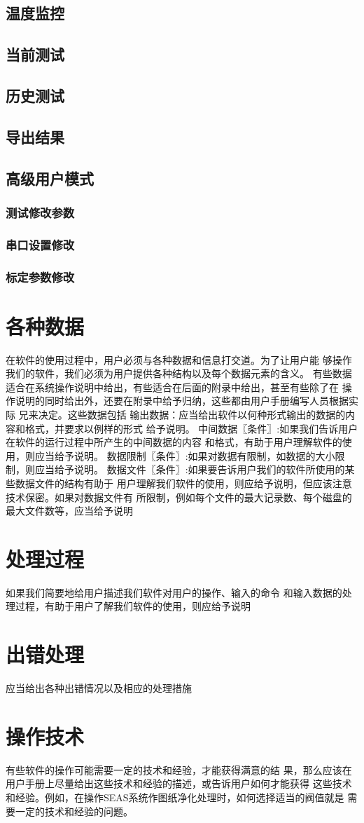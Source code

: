 \subsection{温度监控}
\subsection{当前测试}
\subsection{历史测试}
\subsection{导出结果}
\subsection{高级用户模式\label{subsec:advancedUser}}
\subsubsection*{测试修改参数}
\subsubsection*{串口设置修改}
\subsubsection*{标定参数修改}
\section{各种数据}在软件的使用过程中，用户必须与各种数据和信息打交道。为了让用户能
够操作我们的软件，我们必须为用户提供各种结构以及每个数据元素的含义。
有些数据适合在系统操作说明中给出，有些适合在后面的附录中给出，甚至有些除了在
操作说明的同时给出外，还要在附录中给予归纳，这些都由用户手册编写人员根据实际
兄来决定。这些数据包括
输出数据：应当给出软件以何种形式输出的数据的内容和格式，并要求以例样的形式
给予说明。
中间数据〖条件〗:如果我们告诉用户在软件的运行过程中所产生的中间数据的内容
和格式，有助于用户理解软件的使用，则应当给予说明。
数据限制〖条件〗:如果对数据有限制，如数据的大小限制，则应当给予说明。
数据文件〖条件〗:如果要告诉用户我们的软件所使用的某些数据文件的结构有助于
用户理解我们软件的使用，则应给予说明，但应该注意技术保密。如果对数据文件有
所限制，例如每个文件的最大记录数、每个磁盘的最大文件数等，应当给予说明
\section{处理过程}
如果我们简要地给用户描述我们软件对用户的操作、输入的命令
和输入数据的处理过程，有助于用户了解我们软件的使用，则应给予说明
\section{出错处理}
应当给出各种出错情况以及相应的处理措施
\section{操作技术}
有些软件的操作可能需要一定的技术和经验，才能获得满意的结
果，那么应该在用户手册上尽量给出这些技术和经验的描述，或告诉用户如何才能获得
这些技术和经验。例如，在操作SEAS系统作图纸净化处理时，如何选择适当的阀值就是
需要一定的技术和经验的问题。